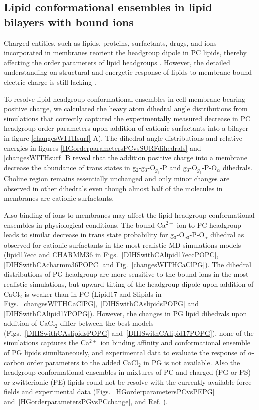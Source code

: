 \documentclass[aps,prl,superscriptaddress,twocolumn]{revtex4}
\begin{document}
\subsection{Lipid conformational ensembles in lipid bilayers with bound ions}

Charged entities, such as lipids, proteins, surfactants, drugs, and ions incorporated in membranes reorient the headgroup dipole in PC lipids, thereby affecting the order parameters of lipid headgroups \cite{seelig87}. However, the detailed understanding on structural and energetic response of lipids to membrane bound electric charge is still lacking \cite{Semchyschyn04}.

To resolve lipid headgroup conformational ensembles in cell membrane bearing positive charge,
we calculated the heavy atom dihedral angle distributions from 
simulations %
that correctly captured the experimentally measured decrease in PC headgroup order parameters upon addition of cationic surfactants into a bilayer in figure \ref{changesWITHsurf} A).
The dihedral angle distributions and relative energies
in figures \ref{HGorderparametersPCvsSURFdihedrals} and \ref{changesWITHsurf} B reveal that the
addition positive charge into a membrane 
decrease the abundance of trans states in g$_2$-g$_3$-O$_{g_3}$-P and g$_3$-O$_{g_3}$-P-O$_\alpha$
dihedrals.
Choline region remains essentially unchanged and only minor changes are observed in other dihedrals even though almost half of the molecules in membranes are cationic surfactants. 

Also binding of ions to membranes may affect the lipid headgroup conformational ensembles in physiological conditions.
The bound Ca$^{2+}$ ion to PC headgroup leads to similar decrease in trans state probability for g$_3$-O$_{g3}$-P-O$_\alpha$ dihedral
as observed for cationic surfactants in the most realistic MD simulations models
(lipid17ecc and CHARMM36 in Figs.~\ref{DIHSwithCAlipid17eccPOPC}, \ref{DIHSwithCAcharmm36POPC} and Fig.~\ref{changesWITHCaClPG}).
The dihedral distributions of PG headgroup are more sensitive to the bound ions in the most realistic simulations,
but upward tilting of the headgroup dipole upon addition of CaCl$_2$ is weaker than in PC
(Lipid17 and Slipids in Figs.~\ref{changesWITHCaClPG},~\ref{DIHSwithCAslipidsPOPG} and \ref{DIHSwithCAlipid17POPG}).
However, the changes in PG lipid dihedrals upon addition of CaCl$_2$ differ between the best models (Figs.~\ref{DIHSwithCAslipidsPOPG} and~\ref{DIHSwithCAlipid17POPG}), none of the simulations captures the Ca$^{2+}$ ion binding affinity and conformational ensemble of PG lipids simultaneously, and experimental data to evaluate the response of $\alpha$-carbon order parameters to the added CaCl$_2$ in PG is not available.
Also the headgroup conformational ensembles in mixtures of PC and charged (PG or PS) or zwitterionic (PE)
lipids could not be resolve with the currently available force fields and experimental data
(Figs.~\ref{HGorderparametersPCvsPEPG} and~\ref{HGorderparametersPGvsPCchange}, and Ref. \cite{antila19,melcr20}).
\end{document}

